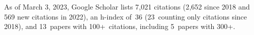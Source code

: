 %
As of March 3, 2023, Google Scholar lists
7,021 citations (2,652 since 2018 and 569 new citations in 2022),
an h-index of~36 (23~counting only citations since 2018),
and 13~papers with 100+~citations, including 5~papers with 300+.
